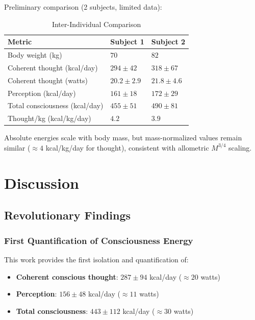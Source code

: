 \documentclass[12pt,twocolumn]{article}
\theoremstyle{remark}
\begin{document}
Preliminary comparison (2 subjects, limited data):

\begin{table}[H]
\centering
\caption{Inter-Individual Comparison}
\begin{tabular}{@{}lll@{}}
\toprule
\textbf{Metric} & \textbf{Subject 1} & \textbf{Subject 2} \\
\midrule
Body weight (kg) & $70$ & $82$ \\
Coherent thought (kcal/day) & $294 \pm 42$ & $318 \pm 67$ \\
Coherent thought (watts) & $20.2 \pm 2.9$ & $21.8 \pm 4.6$ \\
Perception (kcal/day) & $161 \pm 18$ & $172 \pm 29$ \\
Total consciousness (kcal/day) & $455 \pm 51$ & $490 \pm 81$ \\
\midrule
Thought/kg (kcal/kg/day) & $4.2$ & $3.9$ \\
\bottomrule
\end{tabular}
\end{table}

Absolute energies scale with body mass, but mass-normalized values remain similar ($\approx 4$ kcal/kg/day for thought), consistent with allometric $M^{3/4}$ scaling.

\section{Discussion}

\subsection{Revolutionary Findings}

\subsubsection{First Quantification of Consciousness Energy}

This work provides the first isolation and quantification of:

\begin{itemize}
\item \textbf{Coherent conscious thought}: $287 \pm 94$ kcal/day ($\approx 20$ watts)
\item \textbf{Perception}: $156 \pm 48$ kcal/day ($\approx 11$ watts)
\item \textbf{Total consciousness}: $443 \pm 112$ kcal/day ($\approx 30$ watts)
\end{itemize}
\end{document}

